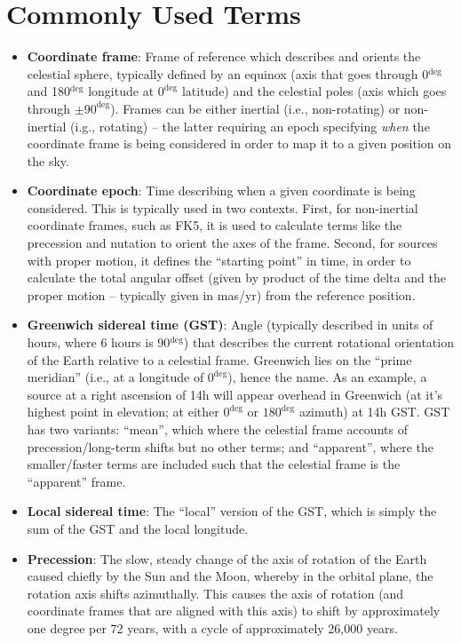 \documentclass[11pt, oneside]{article}
\begin{document}
\appendix
\section{Commonly Used Terms}\label{appx:glossary}
\begin{itemize}
    \item\textbf{Coordinate frame}: Frame of reference which describes and orients the celestial sphere, typically defined by an equinox (axis that goes through 0$^{\deg}$ and 180$^{\deg}$ longitude at $0^{\deg}$ latitude) and the celestial poles (axis which goes through $\pm90^{\deg}$). Frames can be either inertial (i.e., non-rotating) or non-inertial (i.g., rotating) -- the latter requiring an epoch specifying \emph{when} the coordinate frame is being considered in order to map it to a given position on the sky.
    \item\textbf{Coordinate epoch}: Time describing when a given coordinate is being considered. This is typically used in two contexts. First, for non-inertial coordinate frames, such as FK5, it is used to calculate terms like the precession and nutation to orient the axes of the frame. Second, for sources with proper motion, it defines the ``starting point'' in time, in order to calculate the total angular offset (given by product of the time delta and the proper motion -- typically given in mas/yr) from the reference position.
    \item\textbf{Greenwich sidereal time (GST)}: Angle (typically described in units of hours, where 6 hours is 90$^{\deg}$) that describes the current rotational orientation of the Earth relative to a celestial frame. Greenwich lies on the ``prime meridian'' (i.e., at a longitude of $0^{\deg}$), hence the name. As an example, a source at a right ascension of 14h will appear overhead in Greenwich (at it's highest point in elevation; at either $0^{\deg}$ or $180^{\deg}$ azimuth) at 14h GST. GST has two variants: ``mean'', which where the celestial frame accounts of precession/long-term shifts but no other terms; and ``apparent'', where the smaller/faster terms are included such that the celestial frame is the ``apparent'' frame.
    \item\textbf{Local sidereal time}: The ``local'' version of the GST, which is simply the sum of the GST and the local longitude. 
    \item\textbf{Precession}: The slow, steady change of the axis of rotation of the Earth caused chiefly by the Sun and the Moon, whereby in the orbital plane, the rotation axis shifts azimuthally. This causes the axis of rotation (and coordinate frames that are aligned with this axis) to shift by approximately one degree per 72 years, with a cycle of approximately 26,000 years.

\end{itemize}
\end{document}
